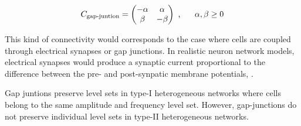 \begin{equation}
   C_{\text{gap-juntion}} = 
    \begin{pmatrix}
        -\alpha & \alpha\\
        \beta & -\beta
    \end{pmatrix}
    \text{ , } \hspace{0.5cm} \alpha, \beta \geq 0
\end{equation}

This kind of connectivity would corresponds to the case where cells are coupled through electrical synapses or gap junctions. In realistic neuron network models, electrical synapses would produce a synaptic current proportional to the difference between the pre- and post-synpatic membrane potentials, \cite{book1}.

\begin{Statement} 
Gap juntions preserve level sets in type-\textrm{I} heterogeneous networks where cells belong to the same amplitude and frequency level set. However, gap-junctions do not preserve individual level sets in type-\textrm{II} heterogeneous networks.
\end{Statement}
